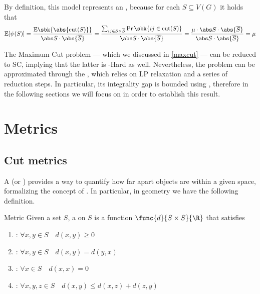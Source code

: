 \documentclass[a4paper, 12pt]{report}
\begin{document}
    By definition, this model represents an , because for each $S \subseteq V(G)$ it holds that $$ \mathbb E[\psi(S)] = \dfrac{\mathbb E\sbk{\abs{\mathrm{cut}(S)}}}{\abs S \cdot \abs{\overline S}} = \dfrac{\sum_{ij \in S \times \overline S}{\Pr \sbk{ij \in \mathrm{cut}(S)}}}{\abs S \cdot  \abs{\overline S}}= \dfrac{\mu \cdot \abs S \cdot \abs{\overline S}}{\abs S \cdot \abs{\overline S}} = \mu$$

    The Maximum Cut problem --- which we discussed in \cref{maxcut} --- can be reduced to SC, implying that the latter is \NPclass-Hard as well. Nevertheless, the problem can be approximated through the  \cite{leightonrao}, which relies on LP relaxation and a series of reduction steps. In particular, its integrality gap is bounded using , therefore in the following sections we will focus on  in order to establish this result.

    \section{Metrics}

    \subsection{Cut metrics}

    A  (or ) provides a way to quantify how far apart objects are within a given space, formalizing the concept of . In particular, in geometry we have the following definition.

    \begin{frameddefn}{Metric}
        Given a set $S$, a  on $S$ is a function $\func{d}{S \times S}{\R}$ that satisfies

        \begin{enumerate}
            \item {}: $\forall x, y \in S \quad d(x,y) \ge 0$
            \item {}: $\forall x, y \in S \quad d(x, y) = d(y, x)$
            \item {}: $\forall x \in S \quad d(x, x) = 0$
            \item {}: $\forall x, y, z \in S \quad d(x,y) \le d(x,z) + d(z, y)$
        \end{enumerate}
    \end{frameddefn}
\end{document}
